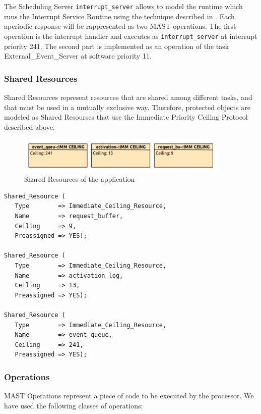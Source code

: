 \documentclass{article}
\begin{document}
The Scheduling Server \texttt{interrupt\_server} allows to model the runtime which runs the Interrupt Service Routine using the technique described in \cite{interrupt-handler}. Each aperiodic response will be rappresented as two MAST operations. The first operation is the interrupt handler and executes as \texttt{interrupt\_server} at interrupt priority 241. The second part is implemented as an operation of the task External\_Event\_Server at software priority 11.

\subsubsection{Shared Resources}

Shared Resources represent resources that are shared among different tasks, and that must be used in a mutually exclusive way. Therefore, protected objects are modeled as Shared Resourses that use the Immediate Priority Ceiling Protocol described above.

\begin{figure}[!htbp]
\centering
\includegraphics[width=4in]{images/shared-resources}
\caption{Shared Resources of the application}
\label{shared-resources}
\end{figure}

\begin{lstlisting}
Shared_Resource (
   Type        => Immediate_Ceiling_Resource,
   Name        => request_buffer,
   Ceiling     => 9,
   Preassigned => YES);

Shared_Resource (
   Type        => Immediate_Ceiling_Resource,
   Name        => activation_log,
   Ceiling     => 13,
   Preassigned => YES);

Shared_Resource (
   Type        => Immediate_Ceiling_Resource,
   Name        => event_queue,
   Ceiling     => 241,
   Preassigned => YES);
\end{lstlisting}

\subsubsection{Operations}

MAST Operations represent a piece of code to be executed by the processor. We have used the following classes of operations:
\end{document}
